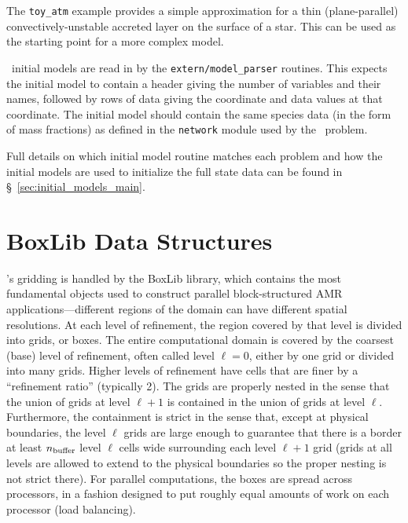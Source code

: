 The {\tt toy\_atm} example provides a simple approximation for a thin
(plane-parallel) convectively-unstable accreted layer on the surface
of a star.  This can be used as the starting point for a more complex
model.  

\maestro\ initial models are read in by the {\tt extern/model\_parser}
routines.  This expects the initial model to contain a header giving
the number of variables and their names, followed by rows of data
giving the coordinate and data values at that coordinate.  The initial
model should contain the same species data (in the form of mass fractions) as
defined in the {\tt network} module used by the \maestro\ problem.

Full details on which initial model routine matches each problem and
how the initial models are used to initialize the full state data can
be found in \S~\ref{sec:initial_models_main}.



\section{BoxLib Data Structures}

\maestro's gridding is handled by the BoxLib library, which
contains the most fundamental objects used to construct parallel
block-structured AMR applications---different
regions of the domain can have different spatial resolutions.
At each level of refinement, the region covered by that level is divided
into grids, or boxes.  The entire computational domain is covered by
the coarsest (base) level of refinement, often called level $\ell=0$, either by one
grid or divided into many grids.
Higher levels of refinement have cells that are finer by a ``refinement ratio''
(typically 2).  The grids are properly nested in the sense that the union 
of grids at level $\ell+1$ is contained in the union of grids at level $\ell$.
Furthermore, the containment is strict in the sense that, except at physical 
boundaries, the level $\ell$ grids are large enough to guarantee that there is
a border at least $n_{\rm buffer}$ level $\ell$ cells wide surrounding each level
$\ell +1$ grid (grids at all levels are allowed to extend to the physical
boundaries so the proper nesting is not strict there).  
For parallel computations, the boxes are spread across processors, in
a fashion designed to put roughly equal amounts of work on each
processor (load balancing).

